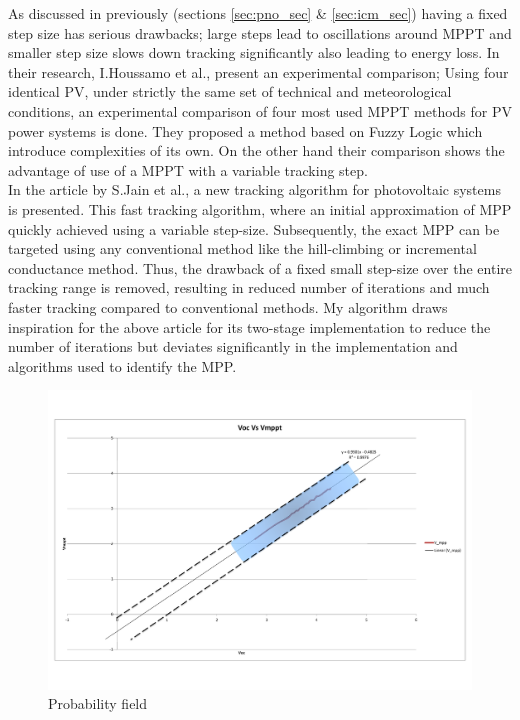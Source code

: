 As discussed in previously (sections \ref{sec:pno_sec} \& \ref{sec:icm_sec}) having a fixed step size has serious drawbacks; large steps lead to oscillations around \ac{MPPT} and smaller step size slows down tracking significantly also leading to energy loss. In their research, I.Houssamo et al.\cite{houssamo2013experimental}, present an experimental comparison; Using four identical \ac{PV}, under strictly the same set of technical and meteorological conditions, an experimental comparison  of four most used MPPT methods for \ac{PV} power systems is done. They  proposed a method based on Fuzzy Logic which introduce complexities of its own. On the other hand their comparison shows the advantage of use of a MPPT with a variable tracking step.\\  

In the article by S.Jain et al.\cite{jain2004new}, a new tracking algorithm for photovoltaic systems is presented. This  fast tracking algorithm, where an initial approximation of \ac{MPP} quickly achieved using a variable step-size. Subsequently, the exact \ac{MPP} can be targeted using any conventional method like the hill-climbing or incremental conductance method. Thus, the drawback of a fixed small step-size over the entire tracking range is removed, resulting in reduced number of iterations and much faster tracking compared to conventional methods. My algorithm draws inspiration for the above article for its two-stage implementation to reduce the number of iterations but deviates significantly in the implementation and algorithms used to identify the \ac{MPP}.\\ 
 

\begin{figure}[H]
  \begin{center}
	  \includegraphics[width=1.1\textwidth]{images/Probability_field}
	  \caption{Probability field }
	  \label{fig:Probability_field}
  \end{center}
\end{figure}

